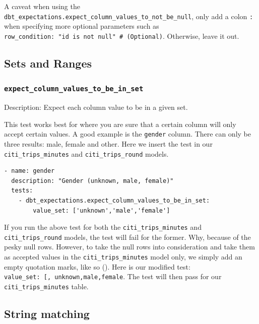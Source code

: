 \documentclass[
]{book}
\begin{document}
A caveat when using the \texttt{dbt\_expectations.expect\_column\_values\_to\_not\_be\_null}, only add a colon \texttt{:} when specifying more optional parameters such as \texttt{row\_condition:\ "id\ is\ not\ null"\ \#\ (Optional)}. Otherwise, leave it out.

\hypertarget{sets-and-ranges}{%
\subsection{Sets and Ranges}\label{sets-and-ranges}}

\hypertarget{expect_column_values_to_be_in_set}{%
\subsubsection{\texorpdfstring{\texttt{expect\_column\_values\_to\_be\_in\_set}}{expect\_column\_values\_to\_be\_in\_set}}\label{expect_column_values_to_be_in_set}}

Description: Expect each column value to be in a given set.

This test works best for where you are sure that a certain column will only accept certain values. A good example is the \texttt{gender} column. There can only be three results: male, female and other. Here we insert the test in our \texttt{citi\_trips\_minutes} and \texttt{citi\_trips\_round} models.

\begin{verbatim}
- name: gender
  description: "Gender (unknown, male, female)"
  tests:
    - dbt_expectations.expect_column_values_to_be_in_set:
        value_set: ['unknown','male','female']
\end{verbatim}

If you run the above test for both the \texttt{citi\_trips\_minutes} and \texttt{citi\_trips\_round} models, the test will fail for the former. Why, because of the pesky null rows. However, to take the null rows into consideration and take them as accepted values in the \texttt{citi\_trips\_minutes} model only, we simply add an empty quotation marks, like so (\texttt{\textquotesingle{}\textquotesingle{}}). Here is our modified test: \texttt{value\_set:\ {[}\textquotesingle{}\textquotesingle{},\ \textquotesingle{}unknown\textquotesingle{},\textquotesingle{}male\textquotesingle{},\textquotesingle{}female\textquotesingle{}{]}}. The test will then pass for our \texttt{citi\_trips\_minutes} table.

\hypertarget{string-matching}{%
\subsection{String matching}\label{string-matching}}
\end{document}
